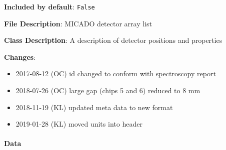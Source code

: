 \textbf{Included by default}: \texttt{False}

\textbf{File Description}: MICADO detector array list

\textbf{Class Description}: A description of detector positions and properties

\textbf{Changes}:

\begin{itemize}
\item 2017-08-12 (OC) id changed to conform with spectroscopy report

\item 2018-07-26 (OC) large gap (chips 5 and 6) reduced to 8 mm

\item 2018-11-19 (KL) updated meta data to new format

\item 2019-01-28 (KL) moved units into header
\end{itemize}


\paragraph{Data%
  \label{data}%
}

\begin{figure}[H]
\noindent{}\label{fig-full-detector-array}
\end{figure}

